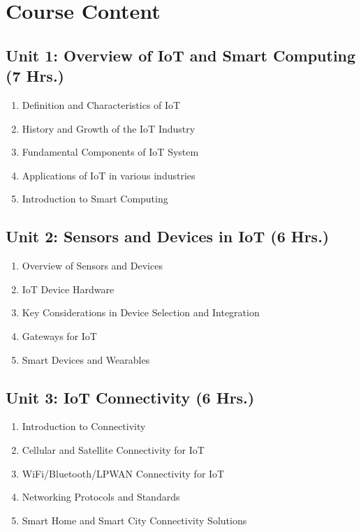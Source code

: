 \section{Course Content}


\subsection*{Unit 1: Overview of IoT and Smart Computing (7 Hrs.)}
\begin{enumerate}
    \item Definition and Characteristics of IoT
    \item History and Growth of the IoT Industry
    \item Fundamental Components of IoT System
    \item Applications of IoT in various industries
    \item Introduction to Smart Computing
\end{enumerate}

\subsection*{Unit 2: Sensors and Devices in IoT (6 Hrs.)}
\begin{enumerate}
    \item Overview of Sensors and Devices
    \item IoT Device Hardware
    \item Key Considerations in Device Selection and Integration
    \item Gateways for IoT
    \item Smart Devices and Wearables
\end{enumerate}

\subsection*{Unit 3: IoT Connectivity (6 Hrs.)}
\begin{enumerate}
    \item Introduction to Connectivity
    \item Cellular and Satellite Connectivity for IoT
    \item WiFi/Bluetooth/LPWAN Connectivity for IoT
    \item Networking Protocols and Standards
    \item Smart Home and Smart City Connectivity Solutions
\end{enumerate}

